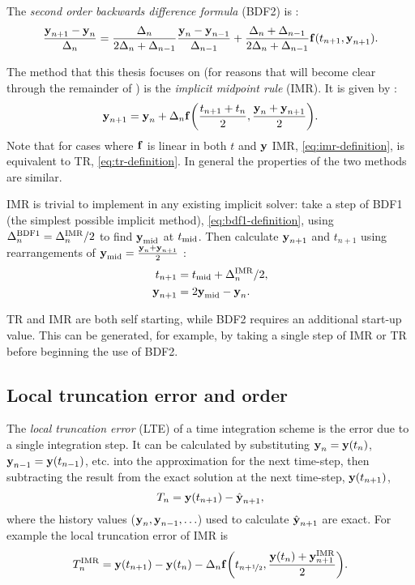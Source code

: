 The \emph{second order backwards difference formula} (BDF2) is \cite[715]{GreshoSani}:
\begin{equation}
  \frac{\boldsymbol{\mathrm{y}}_{n+1} - \boldsymbol{\mathrm{y}}_n}{\Delta_{n}} = \frac{\Delta_{n}}{2\Delta_{n} + \Delta_{n-1}} \frac{\boldsymbol{\mathrm{y}}_n - \boldsymbol{\mathrm{y}}_{n-1}}{\Delta_{n-1}}
  + \frac{\Delta_{n} + \Delta_{n-1}}{2\Delta_{n} + \Delta_{n-1}} {\boldsymbol{\mathrm{f}}}(t_{n+1}, \boldsymbol{\mathrm{y}}_{n+1}).
\end{equation}

The method that this thesis focuses on (for reasons that will become clear through the remainder of ) is the \emph{implicit midpoint rule} (IMR).
It is given by \cite[263]{GreshoSani}:
\begin{equation}
  \label{eq:imr-definition}
  \boldsymbol{\mathrm{y}}_{n+1} = \boldsymbol{\mathrm{y}}_n + \Delta_{n} {\boldsymbol{\mathrm{f}}{\left( \frac{t_{n+1} + t_n}{2}, \frac{\boldsymbol{\mathrm{y}}_n + \boldsymbol{\mathrm{y}}_{n+1}}{2} \right)}}.
\end{equation}
Note that for cases where ${\boldsymbol{\mathrm{f}}}$ is linear in both $t$ and $\boldsymbol{\mathrm{y}}$ IMR, \cref{eq:imr-definition}, is equivalent to TR, \cref{eq:tr-definition}.
In general the properties of the two methods are similar.

IMR is trivial to implement in any existing implicit solver: take a step of BDF1 (the simplest possible implicit method), \cref{eq:bdf1-definition}, using $\Delta_{n}^{\mathrm{BDF1}} = \Delta_{n}^{\mathrm{IMR}}/2$ to find $\boldsymbol{\mathrm{y}}_{\mathrm{mid}}$ at $t_{\mathrm{mid}}$.
Then calculate $\boldsymbol{\mathrm{y}}_{n+1}$ and $t_{n+1}$ using rearrangements of $\boldsymbol{\mathrm{y}}_{\mathrm{mid}} = \frac{\boldsymbol{\mathrm{y}}_n + \boldsymbol{\mathrm{y}}_{n+1}}{2}$ \cite{Malidi2005}:
\begin{equation}
  \begin{aligned}
    t_{n+1} &= t_{\mathrm{mid}} + \Delta_{n}^{\mathrm{IMR}}/2, \\
    \boldsymbol{\mathrm{y}}_{n+1} &= 2\boldsymbol{\mathrm{y}}_{\mathrm{mid}} - \boldsymbol{\mathrm{y}}_n.
  \end{aligned}
\end{equation}

TR and IMR are both self starting, while BDF2 requires an additional start-up value.
This can be generated, for example, by taking a single step of IMR or TR before beginning the use of BDF2.


\subsection{Local truncation error and order}
\label{sec:deriv-local-trunc}

The \emph{local truncation error} (LTE) of a time integration scheme is the error due to a single integration step.
It can be calculated by substituting $\boldsymbol{\mathrm{y}}_n = \boldsymbol{\mathrm{y}}(t_n)$, $\boldsymbol{\mathrm{y}}_{n-1} = \boldsymbol{\mathrm{y}}(t_{n-1})$, etc. into the approximation for the next time-step, then subtracting the result from the exact solution at the next time-step, $\boldsymbol{\mathrm{y}}(t_{n+1})$, \ie
\begin{equation}
  \label{eq:60}
  T_n = \boldsymbol{\mathrm{y}}(t_{n+1}) - \hat{\boldsymbol{\mathrm{y}}}_{n+1},
\end{equation}
where the history values ($\boldsymbol{\mathrm{y}}_{n}, \boldsymbol{\mathrm{y}}_{n-1}, \ldots$) used to calculate $\hat{\boldsymbol{\mathrm{y}}}_{n+1}$ are exact.
For example the local truncation error of IMR is
\begin{equation}
  T_n^{\mathrm{IMR}} =  \boldsymbol{\mathrm{y}}(t_{n+1}) - \boldsymbol{\mathrm{y}}(t_n) - \Delta_{n} {\boldsymbol{\mathrm{f}}{\left( t_{n+\nicefrac{1}{2}}, \frac{\boldsymbol{\mathrm{y}}(t_n) + \boldsymbol{\mathrm{y}}_{n+1}^{\mathrm{IMR}}}{2} \right)}}.
  \label{eq:trunc-start}
\end{equation}

